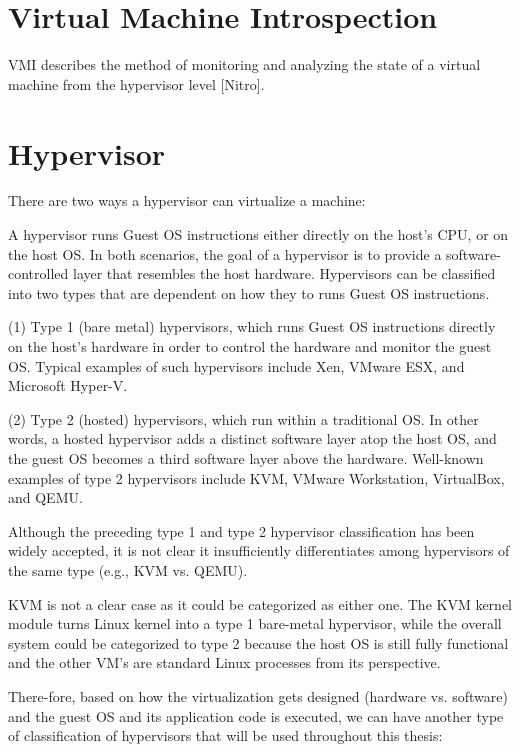 \documentclass{report}
\begin{document}
\begin{spacing}{1.5}
\section{Virtual Machine Introspection}

VMI describes the method of monitoring and analyzing the state of a virtual machine from the hypervisor level [Nitro]. 


\section{Hypervisor}

{\large
There are two ways a hypervisor can virtualize a machine:

A hypervisor runs Guest OS instructions either directly on the host's CPU, or on the host OS. In both scenarios, 
the goal of a hypervisor is to provide a software-controlled layer that resembles the host hardware. Hypervisors 
can be classified into two types that are dependent on how they to runs Guest OS instructions.
\newline
}

{\large 
(1) Type 1 (bare metal) hypervisors, which runs Guest OS instructions directly on the host’s hardware in order to control
the hardware and monitor the guest OS. Typical examples of such hypervisors include Xen, VMware ESX, and Microsoft Hyper-V.
\newline
}

{\large
(2) Type 2 (hosted) hypervisors, which run within a traditional OS. In other words, a
hosted hypervisor adds a distinct software layer atop the host OS, and the guest OS becomes a third
software layer above the hardware. Well-known examples of type 2 hypervisors include KVM, 
VMware Workstation, VirtualBox, and QEMU.
\newline
}

{\large
Although the preceding type 1 and type 2 hypervisor classification has been widely
accepted, it is not clear it insufficiently differentiates among hypervisors of the same type (e.g., KVM vs. QEMU).


KVM is not a clear case as it could be categorized as either one. The KVM kernel module turns Linux kernel into a type 1 bare-metal hypervisor, while the overall system could be categorized to type 2 because the host OS is still fully functional and the other VM's are standard Linux processes from its perspective.


There-fore, based on how the virtualization gets designed (hardware vs. software) and the guest OS and its 
application code is executed, we can have another type of classification of hypervisors that will be used 
throughout this thesis:
\newline
}


\end{spacing}
\end{document}
